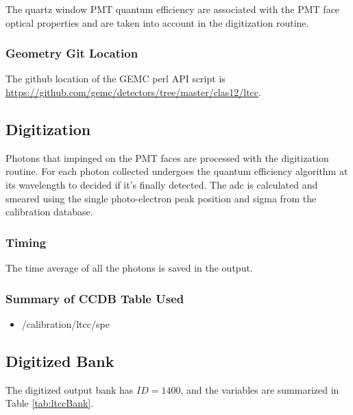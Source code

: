 The quartz window PMT quantum efficiency are associated with the PMT face optical properties and are taken into account in
the digitization routine.

\subsubsection{Geometry Git Location}
The github location of the GEMC perl API script is  \url{https://github.com/gemc/detectors/tree/master/clas12/ltcc}.


\subsection{Digitization}

Photons that impinged on the PMT faces are processed with the digitization routine.
For each photon collected undergoes the quantum efficiency algorithm at its wavelength to decided if it's finally detected.
The adc is calculated and smeared using the single photo-electron peak position and sigma from the calibration database.


\subsubsection{Timing}

The time average of all the photons is saved in the output.

\subsubsection{Summary of CCDB Table Used}

\begin{itemize}
	\item /calibration/ltcc/spe
\end{itemize}

\subsection{Digitized Bank}

The digitized output bank has $ID=1400$, and the variables are summarized in Table \ref{tab:ltccBank}.

